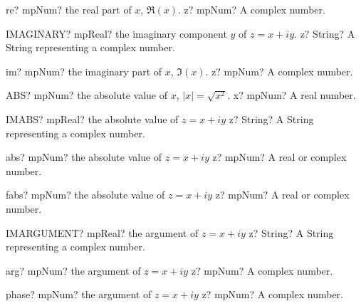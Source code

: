 \documentclass[12pt,a4paper,openany]{book}
\begin{document}
\begin{mpFunctionsExtract}
\mpFunctionOne
{re? mpNum? the real part of $x$, $\Re(x)$.}
{z? mpNum? A complex number.}
\end{mpFunctionsExtract}

\begin{mpFunctionsExtract}
\mpWorksheetFunctionOneNotImplemented
{IMAGINARY? mpReal? the imaginary component $y$ of $z=x+iy$.}
{z? String? A String representing a complex number.}
\end{mpFunctionsExtract}

\begin{mpFunctionsExtract}
\mpFunctionOne
{im? mpNum? the imaginary part of $x$, $\Im(x)$.}
{z? mpNum? A complex number.}
\end{mpFunctionsExtract}

\begin{mpFunctionsExtract}
\mpWorksheetFunctionOneNotImplemented
{ABS? mpNum? the absolute value of $x$, $|x| = \sqrt{x^2}$.}
{x? mpNum? A real number.}
\end{mpFunctionsExtract}

\begin{mpFunctionsExtract}
\mpWorksheetFunctionOneNotImplemented
{IMABS? mpReal? the absolute value of $z=x+iy$}
{z? String? A String representing a complex number.}
\end{mpFunctionsExtract}

\begin{mpFunctionsExtract}
\mpFunctionOne
{abs? mpNum? the absolute value of $z=x+iy$}
{z? mpNum? A real or complex number.}
\end{mpFunctionsExtract}

\begin{mpFunctionsExtract}
\mpFunctionOne
{fabs? mpNum? the absolute value of $z=x+iy$}
{z? mpNum? A real or complex number.}
\end{mpFunctionsExtract}

\begin{mpFunctionsExtract}
\mpWorksheetFunctionOneNotImplemented
{IMARGUMENT? mpReal? the argument of $z=x+iy$}
{z? String? A String representing a complex number.}
\end{mpFunctionsExtract}

\begin{mpFunctionsExtract}
\mpFunctionOne
{arg? mpNum? the argument of $z=x+iy$}
{z? mpNum? A complex number.}
\end{mpFunctionsExtract}

\begin{mpFunctionsExtract}
\mpFunctionOne
{phase? mpNum? the argument of $z=x+iy$}
{z? mpNum? A complex number.}
\end{mpFunctionsExtract}
\end{document}
